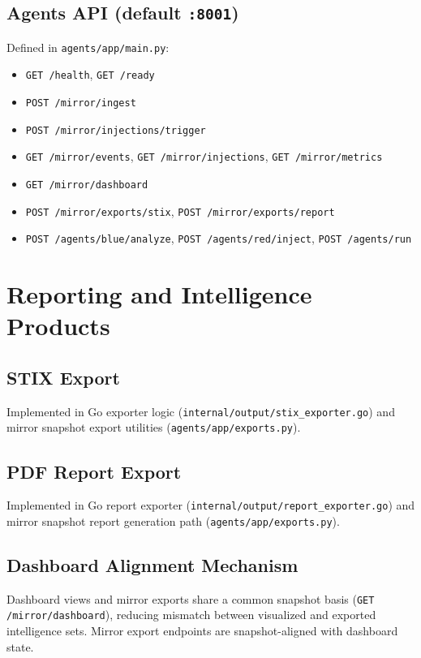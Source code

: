 \documentclass[11pt,a4paper]{article}
\begin{document}
\subsection{Agents API (default \texttt{:8001})}
Defined in \texttt{agents/app/main.py}:
\begin{itemize}[leftmargin=1.5em]
    \item \texttt{GET /health}, \texttt{GET /ready}
    \item \texttt{POST /mirror/ingest}
    \item \texttt{POST /mirror/injections/trigger}
    \item \texttt{GET /mirror/events}, \texttt{GET /mirror/injections}, \texttt{GET /mirror/metrics}
    \item \texttt{GET /mirror/dashboard}
    \item \texttt{POST /mirror/exports/stix}, \texttt{POST /mirror/exports/report}
    \item \texttt{POST /agents/blue/analyze}, \texttt{POST /agents/red/inject}, \texttt{POST /agents/run}
\end{itemize}

\section{Reporting and Intelligence Products}

\subsection{STIX Export}
Implemented in Go exporter logic (\texttt{internal/output/stix\_exporter.go}) and mirror snapshot export utilities (\texttt{agents/app/exports.py}).

\subsection{PDF Report Export}
Implemented in Go report exporter (\texttt{internal/output/report\_exporter.go}) and mirror snapshot report generation path (\texttt{agents/app/exports.py}).

\subsection{Dashboard Alignment Mechanism}
Dashboard views and mirror exports share a common snapshot basis (\texttt{GET /mirror/dashboard}), reducing mismatch between visualized and exported intelligence sets. Mirror export endpoints are snapshot-aligned with dashboard state.
\end{document}
